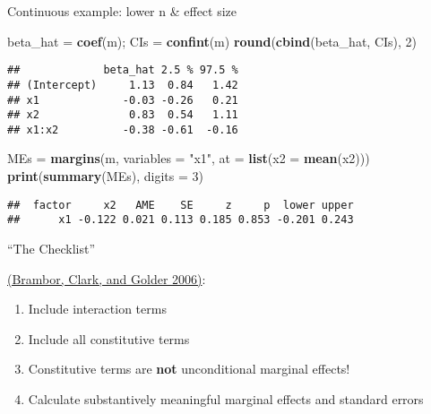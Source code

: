 \documentclass[
  ignorenonframetext,
]{beamer}
\newenvironment{Shaded}{\begin{snugshade}}{\end{snugshade}}
\newcommand{\AttributeTok}[1]{\textcolor[rgb]{0.13,0.29,0.53}{#1}}
\newcommand{\DecValTok}[1]{\textcolor[rgb]{0.00,0.00,0.81}{#1}}
\newcommand{\FunctionTok}[1]{\textcolor[rgb]{0.13,0.29,0.53}{\textbf{#1}}}
\newcommand{\NormalTok}[1]{#1}
\newcommand{\OtherTok}[1]{\textcolor[rgb]{0.56,0.35,0.01}{#1}}
\newcommand{\StringTok}[1]{\textcolor[rgb]{0.31,0.60,0.02}{#1}}
\providecommand{\tightlist}{%
  \setlength{\itemsep}{0pt}\setlength{\parskip}{0pt}}
\newcommand{\setsep}{\setlength{\itemsep}{3pt}}
\newcommand{\setskip}{\setlength{\parskip}{3pt}}
\renewcommand{\tightlist}{\setsep\setskip}
\begin{document}
\begin{frame}[fragile]{Continuous example: lower n \& effect size}
\label{continuous-example-lower-n-effect-size-1}
\begin{Shaded}
\begin{Highlighting}[]
\NormalTok{beta\_hat }\OtherTok{=} \FunctionTok{coef}\NormalTok{(m); CIs }\OtherTok{=} \FunctionTok{confint}\NormalTok{(m)}
\FunctionTok{round}\NormalTok{(}\FunctionTok{cbind}\NormalTok{(beta\_hat, CIs), }\DecValTok{2}\NormalTok{)}
\end{Highlighting}
\end{Shaded}

\begin{verbatim}
##             beta_hat 2.5 % 97.5 %
## (Intercept)     1.13  0.84   1.42
## x1             -0.03 -0.26   0.21
## x2              0.83  0.54   1.11
## x1:x2          -0.38 -0.61  -0.16
\end{verbatim}

\pause

\begin{Shaded}
\begin{Highlighting}[]
\NormalTok{MEs }\OtherTok{=} \FunctionTok{margins}\NormalTok{(m, }\AttributeTok{variables =} \StringTok{"x1"}\NormalTok{, }\AttributeTok{at =} \FunctionTok{list}\NormalTok{(}\AttributeTok{x2 =} \FunctionTok{mean}\NormalTok{(x2)))}
\FunctionTok{print}\NormalTok{(}\FunctionTok{summary}\NormalTok{(MEs), }\AttributeTok{digits =} \DecValTok{3}\NormalTok{)}
\end{Highlighting}
\end{Shaded}

\begin{verbatim}
##  factor     x2   AME    SE     z     p  lower upper
##      x1 -0.122 0.021 0.113 0.185 0.853 -0.201 0.243
\end{verbatim}
\end{frame}

\begin{frame}{``The Checklist''}
\label{the-checklist}
\pause

\href{https://www.jstor.org/stable/25791835}{(Brambor, Clark, and Golder 2006)}:

\pause

\begin{enumerate}[<+->]
\tightlist
\item
  Include interaction terms
\item
  Include all constitutive terms
\item
  Constitutive terms are \textbf{not} unconditional marginal effects!
\item
  Calculate substantively meaningful marginal effects and standard errors
\end{enumerate}
\end{frame}
\end{document}
